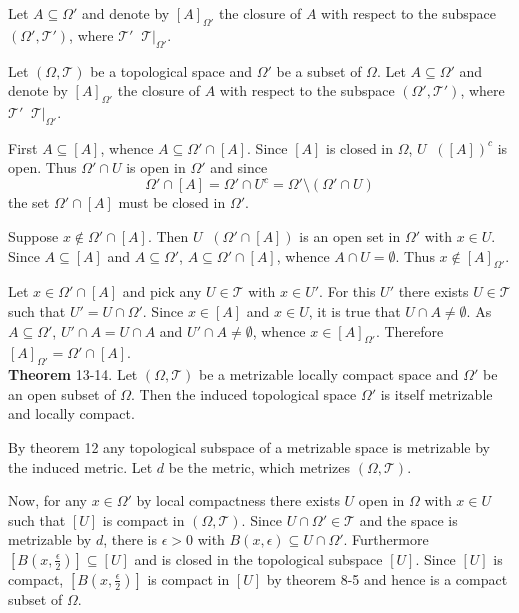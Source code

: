 \documentclass[a4paper]{article}
\newcommand{\clo}[1]{\left [ #1 \right ]}
\newcommand{\brac}[1]{\left ( #1 \right )}
\newcommand{\induc}[1]{\left . #1 \right \vert}
\newcommand{\Tcal}{\mathcal{T}}
\newcommand{\defn}{\mathop{\overset{\Delta}{=}}\nolimits}
\begin{document}
Let $A\subseteq \Omega'$ and denote by $\clo{A}_{\Omega'}$ the closure of $A$ with respect to the subspace $\brac{\Omega',\Tcal'}$, where $\Tcal'\defn \induc{\Tcal}_{\Omega'}$.

Let $\brac{\Omega, \Tcal}$ be a topological space and $\Omega'$ be a subset of $\Omega$. Let $A\subseteq \Omega'$ and denote by $\clo{A}_{\Omega'}$ the closure of $A$ with respect to the subspace $\brac{\Omega',\Tcal'}$, where $\Tcal'\defn \induc{\Tcal}_{\Omega'}$.

First $A\subseteq \clo{A}$, whence $A\subseteq \Omega'\cap\clo{A}$. Since $\clo{A}$ is closed in $\Omega$, $U\defn \brac{\clo{A}}^c$ is open. Thus $\Omega'\cap U$ is open in $\Omega'$ and since \[\Omega'\cap \clo{A} = \Omega'\cap U^c = \Omega'\setminus \brac{\Omega'\cap U}\] the set $\Omega'\cap \clo{A}$ must be closed in $\Omega'$.

Suppose $x\notin \Omega'\cap \clo{A}$. Then $U\defn \brac{\Omega'\cap \clo{A}}$ is an open set in $\Omega'$ with $x\in U$. Since $A\subseteq \clo{A}$ and $A\subseteq \Omega'$, $A\subseteq \Omega'\cap \clo{A}$, whence $A\cap U = \emptyset$. Thus $x\notin \clo{A}_{\Omega'}$.

Let $x\in \Omega'\cap \clo{A}$ and pick any $U\in \Tcal$ with $x\in U'$. For this $U'$ there exists $U\in \Tcal$ such that $U'=U\cap \Omega'$. Since $x\in \clo{A}$ and $x\in U$, it is true that $U\cap A \neq \emptyset$. As $A\subseteq \Omega'$, $U'\cap A = U\cap A$ and $U'\cap A \neq \emptyset$, whence $x\in \clo{A}_{\Omega'}$. Therefore $\clo{A}_{\Omega'} = \Omega' \cap \clo{A}$.\\

\label{thm:subspace_loc_compact} \noindent \textbf{Theorem} 13-14.
Let $\brac{\Omega,\Tcal}$ be a metrizable locally compact space and $\Omega'$ be an open subset of $\Omega$. Then the induced topological space $\Omega'$ is itself metrizable and locally compact.

By theorem 12 any topological subspace of a metrizable space is metrizable by the induced metric. Let $d$ be the metric, which metrizes $\brac{\Omega, \Tcal}$.

Now, for any $x\in \Omega'$ by local compactness there exists $U$ open in $\Omega$ with $x\in U$ such that $\clo{U}$ is compact in $\brac{\Omega,\Tcal}$. Since $U\cap \Omega'\in \Tcal$ and the space is metrizable by $d$, there is $\epsilon>0$ with $B\brac{x,\epsilon}\subseteq U\cap \Omega'$. Furthermore $\clo{B\brac{x,\frac{\epsilon}{2}}}\subseteq \clo{U}$ and is closed in the topological subspace $\clo{U}$. Since $\clo{U}$ is compact, $\clo{B\brac{x,\frac{\epsilon}{2}}}$ is compact in $\clo{U}$ by theorem 8-5 and hence is a compact subset of $\Omega$.
\end{document}

